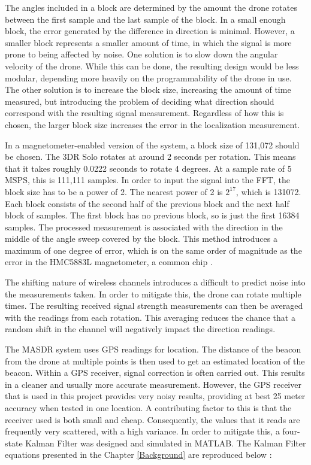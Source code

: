 The angles included in a block are determined by the amount the drone rotates between the first sample and the last sample of the block. In a small enough block, the error generated by the difference in direction is minimal. However, a smaller block represents a smaller amount of time, in which the signal is more prone to being affected by noise. One solution is to slow down the angular velocity of the drone. While this can be done, the resulting design would be less modular, depending more heavily on the programmability of the drone in use. The other solution is to increase the block size, increasing the amount of time measured, but introducing the problem of deciding what direction should correspond with the resulting signal measurement. Regardless of how this is chosen, the larger block size increases the error in the localization measurement.\par 

In a magnetometer-enabled version of the system, a block size of 131,072 should be chosen. The 3DR Solo rotates at around 2 seconds per rotation. This means that it takes roughly 0.0222 seconds to rotate 4 degrees. At a sample rate of 5 MSPS, this is 111,111 samples. In order to input the signal into the FFT, the block size has to be a power of 2. The nearest power of 2 is $2^{17}$, which is 131072. Each block consists of the second half of the previous block and the next half block of samples. The first block has no previous block, so is just the first 16384 samples. The processed measurement is associated with the direction in the middle of the angle sweep covered by the block. This method introduces a maximum of one degree of error, which is on the same order of magnitude as the error in the HMC5883L magnetometer, a common chip \cite{magnetometer_data}. \par 
The shifting nature of wireless channels introduces a difficult to predict noise into the measurements taken. In order to mitigate this, the drone can rotate multiple times. The resulting received signal strength measurements can then be averaged with the readings from each rotation. This averaging reduces the chance that a random shift in the channel will negatively impact the direction readings. \par 
The MASDR system uses GPS readings for location. The distance of the beacon from the drone at multiple points is then used to get an estimated location of the beacon. Within a GPS receiver, signal correction is often carried out. This results in a cleaner and usually more accurate measurement. However, the GPS receiver that is used in this project provides very noisy results, providing at best 25 meter accuracy when tested in one location. A contributing factor to this is that the receiver used is both small and cheap. Consequently, the values that it reads are frequently very scattered, with a high variance. In order to mitigate this, a four-state Kalman Filter was designed and simulated in MATLAB. The Kalman Filter equations presented in the Chapter \ref{Background} are reproduced below \cite{kf_book}: \par

